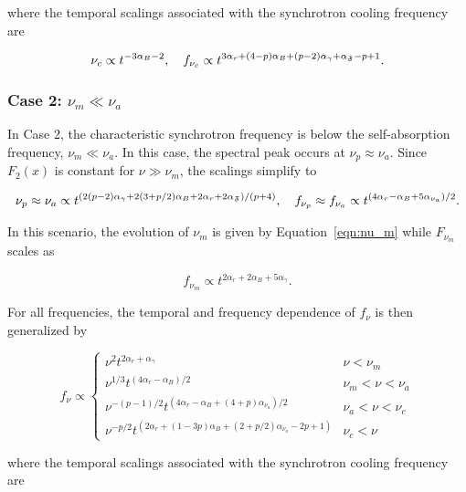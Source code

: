 \documentclass[12pt,preprint]{aastex}
\begin{document}
\noindent
where the temporal scalings associated with the synchrotron cooling frequency
are

\begin{equation}
\nu_c\propto t^{-3\alpha_B-2},~~~
f_{\nu_c}\propto t^{3\alpha_r+(4-p)\alpha_B+(p-2)\alpha_{\gamma}+\alpha_{\frak{F}}-p+1}.
\label{eqn:nu_c_1}
\end{equation}

\subsubsection{Case 2: $\nu_m \ll \nu_a$}
In  Case 2,  the  characteristic synchrotron  frequency  is below  the
self-absorption  frequency,  $\nu_m \ll  \nu_a$.   In  this case,  the
spectral  peak occurs at  $\nu_{p}\approx  \nu_a$.  Since $F_2(x)$
is constant  for $\nu \gg \nu_m$, the scalings simplify to 

\begin{equation}
\nu_{p}\approx \nu_a\propto t^{(2(p-2)\alpha_{\gamma}+2(3+p/2)\alpha_B+2\alpha_r+2\alpha_{\frak{F}})/(p+4)},~~~
f_{\nu_{p}}\approx f_{\nu_a}\propto t^{(4\alpha_r-\alpha_B+5\alpha_{\nu_a})/2}.
\label{eqn:peak_2}
\end{equation}

\noindent
In this scenario, the evolution of $\nu_m$ is given by
Equation~\ref{eqn:nu_m} while $F_{\nu_m}$ scales as

\begin{equation}
f_{\nu_m} \propto t^{2\alpha_r+2\alpha_B+5\alpha_{\gamma}}.
\end{equation}
\label{eqn:f_nu_m_2}

\noindent
For all frequencies, the temporal and frequency dependence of $f_{\nu}$
is then generalized by

\begin{equation}
f_{\nu} \propto 
  \begin{cases}
    \nu^2 t^{2\alpha_r+\alpha_{\gamma}} & \nu < \nu_m \\
    \nu^{1/3} t^{(4\alpha_r-\alpha_B)/2} & \nu_m < \nu < \nu_a \\
    \nu^{-(p-1)/2} t^{(4\alpha_r-\alpha_B+(4+p)\alpha_{\nu_a})/2} & \nu_a < \nu < \nu_c \\
    \nu^{-p/2} t^{(2\alpha_r+(1-3p)\alpha_B+(2+p/2)\alpha_{\nu_a}-2p+1)} & \nu_c < \nu
  \end{cases}
\end{equation}
\label{eqn:case_2}

\noindent
where the temporal scalings associated with the synchrotron cooling frequency
are
\end{document}
